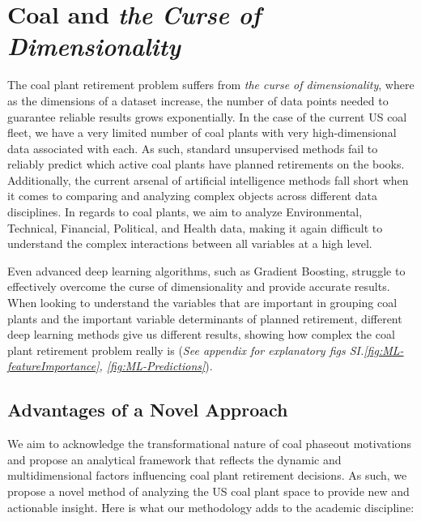 

\section{Coal and \textit{the Curse of Dimensionality}}

The coal plant retirement problem suffers from \textit{the curse of dimensionality}, where as the dimensions of a dataset 
increase, the number of data points needed to guarantee reliable results grows exponentially. In the case of the current US coal 
fleet, we have a very limited number of coal plants with very high-dimensional data associated with each. As such, standard 
unsupervised methods fail to reliably predict which active coal plants have planned retirements on the books. Additionally, the 
current arsenal of artificial intelligence methods fall short when it comes to comparing and analyzing complex objects across different 
data disciplines. In regards to coal plants, we aim to analyze Environmental, Technical, Financial, Political, and Health data, making 
it again difficult to understand the complex interactions between all variables at a high level. 

Even advanced deep learning algorithms, 
such as Gradient Boosting, struggle to effectively overcome the curse of dimensionality and provide accurate results. When looking to 
understand the variables that are important in grouping coal plants and the important variable determinants of planned retirement, different deep learning methods give us 
different results, showing how complex the coal plant retirement problem really is (\textit{See appendix for explanatory figs SI.\ref{fig:ML-featureImportance}, \ref{fig:ML-Predictions}}).


\subsection*{Advantages of a Novel Approach}
We aim to acknowledge the transformational nature of coal phaseout motivations and propose an analytical framework that reflects the 
dynamic and multidimensional factors influencing coal plant retirement decisions. As such, we propose a novel method of analyzing the 
US coal plant space to provide new and actionable insight. Here is what our methodology adds to the academic discipline:


